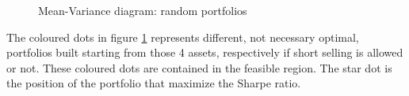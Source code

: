 \begin{figure}[h]
    \centering
    \qquad
    \caption{Mean-Variance diagram: random portfolios}%
    \label{fig:random_portoflios}%
\end{figure}


The coloured dots in figure \ref{fig:random_portoflios} represents different, not necessary optimal, portfolios built starting from those 4 assets, respectively if short selling is allowed or not. These coloured dots are contained in the  feasible region. The star dot is the position of the portfolio that maximize the Sharpe ratio.


